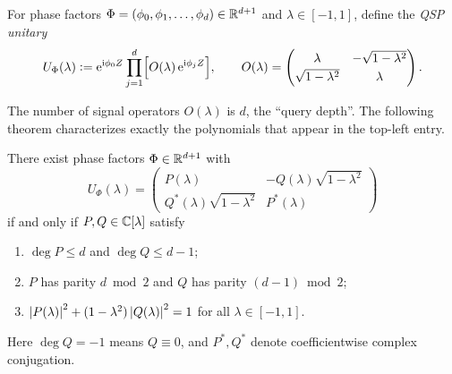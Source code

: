 \begin{definition}
\label{def:lec08-qsp}
For phase factors $\Phi=(\phi_0,\phi_1,\dots,\phi_d)\in\mathbb{R}^{d+1}$ and
$\lambda\in[-1,1]$, define the \emph{QSP unitary}
\begin{equation}
  U_\Phi(\lambda)\vcentcolon=\mathrm{e}^{\mathrm{i}\phi_0 Z}\prod_{j=1}^{d}
     \Bigl[O(\lambda)\,\mathrm{e}^{\mathrm{i}\phi_j Z}\Bigr],
  \qquad O(\lambda)=\begin{pmatrix}\lambda&-\sqrt{1-\lambda^2}\\[2pt]
    \sqrt{1-\lambda^2}&\lambda\end{pmatrix}.
  \label{eq:lec08-Uphi}
\end{equation}
\end{definition}

The number of signal operators $O(\lambda)$ is $d$, the ``query depth''. The
following theorem characterizes exactly the polynomials that appear in the top-left
entry.

\begin{theorem}
\label{thm:lec08-qsp}
There exist phase factors $\Phi\in\mathbb{R}^{d+1}$ with
\begin{equation}
  U_\Phi(\lambda)
  =\begin{pmatrix}P(\lambda)&-Q(\lambda)\sqrt{1-\lambda^2}\\[3pt]
    Q^*(\lambda)\sqrt{1-\lambda^2}&P^*(\lambda)\end{pmatrix}
  \label{eq:lec08-qspform}
\end{equation}
if and only if $P,Q\in\mathbb{C}[\lambda]$ satisfy
\begin{enumerate}[leftmargin=2em,nosep]
  \item[\textup{(1)}] $\deg P\le d$ and $\deg Q\le d-1$;
  \item[\textup{(2)}] $P$ has parity $d\bmod2$ and $Q$ has parity $(d-1)\bmod2$;
  \item[\textup{(3)}] $\left\lvert P(\lambda) \right\rvert^2+(1-\lambda^2)\left\lvert Q(\lambda) \right\rvert^2=1$ for all
        $\lambda\in[-1,1]$.
\end{enumerate}
Here $\deg Q=-1$ means $Q\equiv0$, and $P^*,Q^*$ denote coefficientwise complex
conjugation.
\end{theorem}

